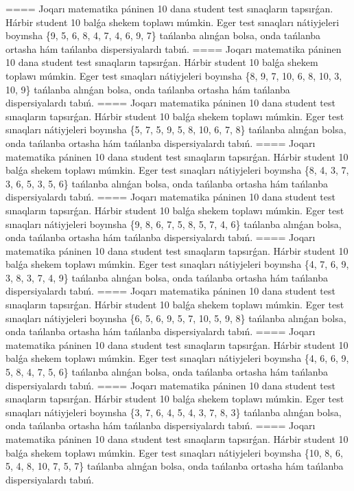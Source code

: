 ====
Joqarı matematika páninen 10 dana student test sınaqların tapsırǵan. Hárbir student 10 balǵa shekem toplawı múmkin. Eger test sınaqları nátiyjeleri boyınsha \{9, 5, 6, 8, 4, 7, 4, 6, 9, 7\} tańlanba alınǵan bolsa, onda tańlanba ortasha hám tańlanba dispersiyalardı tabıń.
====
Joqarı matematika páninen 10 dana student test sınaqların tapsırǵan. Hárbir student 10 balǵa shekem toplawı múmkin. Eger test sınaqları nátiyjeleri boyınsha \{8, 9, 7, 10, 6, 8, 10, 3, 10, 9\} tańlanba alınǵan bolsa, onda tańlanba ortasha hám tańlanba dispersiyalardı tabıń.
====
Joqarı matematika páninen 10 dana student test sınaqların tapsırǵan. Hárbir student 10 balǵa shekem toplawı múmkin. Eger test sınaqları nátiyjeleri boyınsha \{5, 7, 5, 9, 5, 8, 10, 6, 7, 8\} tańlanba alınǵan bolsa, onda tańlanba ortasha hám tańlanba dispersiyalardı tabıń.
====
Joqarı matematika páninen 10 dana student test sınaqların tapsırǵan. Hárbir student 10 balǵa shekem toplawı múmkin. Eger test sınaqları nátiyjeleri boyınsha \{8, 4, 3, 7, 3, 6, 5, 3, 5, 6\} tańlanba alınǵan bolsa, onda tańlanba ortasha hám tańlanba dispersiyalardı tabıń.
====
Joqarı matematika páninen 10 dana student test sınaqların tapsırǵan. Hárbir student 10 balǵa shekem toplawı múmkin. Eger test sınaqları nátiyjeleri boyınsha \{9, 8, 6, 7, 5, 8, 5, 7, 4, 6\} tańlanba alınǵan bolsa, onda tańlanba ortasha hám tańlanba dispersiyalardı tabıń.
====
Joqarı matematika páninen 10 dana student test sınaqların tapsırǵan. Hárbir student 10 balǵa shekem toplawı múmkin. Eger test sınaqları nátiyjeleri boyınsha \{4, 7, 6, 9, 3, 8, 3, 7, 4, 9\} tańlanba alınǵan bolsa, onda tańlanba ortasha hám tańlanba dispersiyalardı tabıń.
====
Joqarı matematika páninen 10 dana student test sınaqların tapsırǵan. Hárbir student 10 balǵa shekem toplawı múmkin. Eger test sınaqları nátiyjeleri boyınsha \{6, 5, 6, 9, 5, 7, 10, 5, 9, 8\} tańlanba alınǵan bolsa, onda tańlanba ortasha hám tańlanba dispersiyalardı tabıń.
====
Joqarı matematika páninen 10 dana student test sınaqların tapsırǵan. Hárbir student 10 balǵa shekem toplawı múmkin. Eger test sınaqları nátiyjeleri boyınsha \{4, 6, 6, 9, 5, 8, 4, 7, 5, 6\} tańlanba alınǵan bolsa, onda tańlanba ortasha hám tańlanba dispersiyalardı tabıń.
====
Joqarı matematika páninen 10 dana student test sınaqların tapsırǵan. Hárbir student 10 balǵa shekem toplawı múmkin. Eger test sınaqları nátiyjeleri boyınsha \{3, 7, 6, 4, 5, 4, 3, 7, 8, 3\} tańlanba alınǵan bolsa, onda tańlanba ortasha hám tańlanba dispersiyalardı tabıń.
====
Joqarı matematika páninen 10 dana student test sınaqların tapsırǵan. Hárbir student 10 balǵa shekem toplawı múmkin. Eger test sınaqları nátiyjeleri boyınsha \{10, 8, 6, 5, 4, 8, 10, 7, 5, 7\} tańlanba alınǵan bolsa, onda tańlanba ortasha hám tańlanba dispersiyalardı tabıń.
